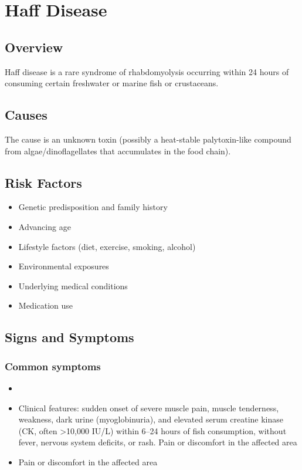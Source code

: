 \chapter{Haff Disease}
\label{sec:Haff Disease}

\section{Overview}
Haff disease is a rare syndrome of rhabdomyolysis occurring within 24 hours of consuming certain freshwater or marine fish or crustaceans.
\section{Causes}
The cause is an unknown toxin (possibly a heat-stable palytoxin-like compound from algae/dinoflagellates that accumulates in the food chain).     
\section{Risk Factors}

\begin{itemize}[noitemsep]
  \item Genetic predisposition and family history
  \item Advancing age
  \item Lifestyle factors (diet, exercise, smoking, alcohol)
  \item Environmental exposures
  \item Underlying medical conditions
  \item Medication use
\end{itemize}
\section{Signs and Symptoms}

\subsection{Common symptoms}
\begin{itemize}[noitemsep]
  \item \item Clinical features: sudden onset of severe muscle pain, muscle tenderness, weakness, dark urine (myoglobinuria), and elevated serum creatine kinase (CK, often >10,000 IU/L) within 6--24 hours of fish consumption, without fever, nervous system deficits, or rash. Pain or discomfort in the affected area    \item Pain or discomfort in the affected area
  \end{itemize}

